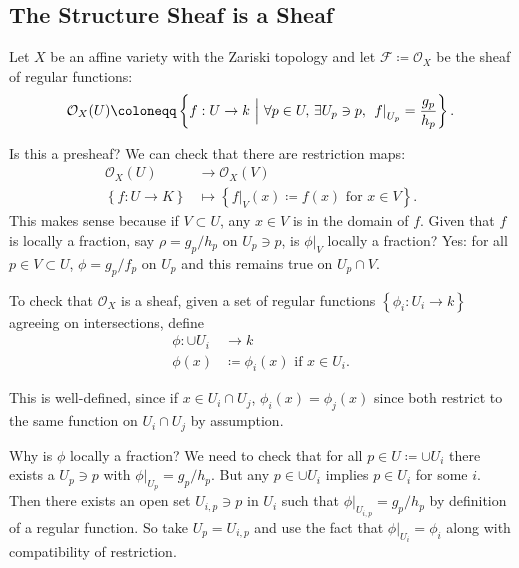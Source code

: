 \hypertarget{the-structure-sheaf-is-a-sheaf}{%
\subsection{The Structure Sheaf is a
Sheaf}\label{the-structure-sheaf-is-a-sheaf}}

\begin{example}

Let \(X\) be an affine variety with the Zariski topology and let
\(\mathcal{F} \coloneqq{\mathcal{O}}_X\) be the sheaf of regular
functions:
\begin{align*}  
{\mathcal{O}}_X(U) \coloneqq\left\{{f: U\to k {~\mathrel{\Big|}~}\forall p\in U,\, \exists U_p \ni p,\,\, { \left.{{f}} \right|_{{U_p}} } ={g_p \over h_p} }\right\}
.\end{align*}

Is this a presheaf? We can check that there are restriction maps:
\begin{align*}  
{\mathcal{O}}_X(U) &\to {\mathcal{O}}_X(V) \\
\left\{{f: U\to K}\right\} &\mapsto \left\{{{ \left.{{f}} \right|_{{V}} }(x) \coloneqq f(x) \text{ for } x \in V }\right\}
.\end{align*}
This makes sense because if \(V\subset U\), any \(x\in V\) is in the
domain of \(f\). Given that \(f\) is locally a fraction, say
\(\rho = g_p / h_p\) on \(U_p \ni p\), is
\({ \left.{{\phi}} \right|_{{V}} }\) locally a fraction? Yes: for all
\(p\in V\subset U\), \(\phi = g_p / f_p\) on \(U_p\) and this remains
true on \(U_p \cap V\).

To check that \({\mathcal{O}}_X\) is a sheaf, given a set of regular
functions \(\left\{{\phi_i: U_i \to k}\right\}\) agreeing on
intersections, define
\begin{align*}  
\phi: \cup U_i &\to k\\
\phi(x) &\coloneqq\phi_i(x) \text{ if }x\in U_i
.\end{align*}

This is well-defined, since if \(x\in U_i \cap U_j\),
\(\phi_i(x) = \phi_j(x)\) since both restrict to the same function on
\(U_i \cap U_j\) by assumption.

Why is \(\phi\) locally a fraction? We need to check that for all
\(p\in U \coloneqq\cup U_i\) there exists a \(U_p \ni p\) with
\({ \left.{{\phi}} \right|_{{U_p}} } = g_p/h_p\). But any
\(p\in \cup U_i\) implies \(p\in U_i\) for some \(i\). Then there exists
an open set \(U_{i, p} \ni p\) in \(U_i\) such that
\({ \left.{{\phi}} \right|_{{U_{i, p}}} } = g_p / h_p\) by definition of
a regular function. So take \(U_p = U_{i, p}\) and use the fact that
\({ \left.{{\phi}} \right|_{{U_i}} } = \phi_i\) along with compatibility
of restriction.

\end{example}

